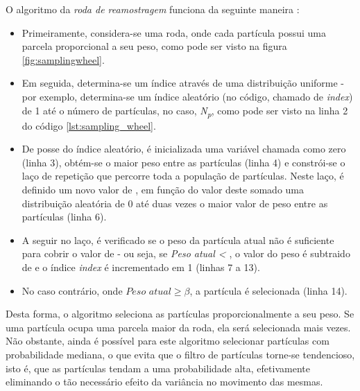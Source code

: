 \documentclass[
	12pt,				%
	openright,			%
	oneside,			%
	a4paper,			%
	english,			%
	french,				%
	spanish,			%
	brazil,				%
	]{abntex2}
\begin{document}


O algoritmo da \emph{roda de reamostragem} funciona da seguinte maneira \cite{resampling}:

\begin{itemize}
    \item Primeiramente, considera-se uma roda, onde cada partícula possui uma parcela proporcional a seu peso, como pode ser visto na figura \ref{fig:samplingwheel}.
    \item Em seguida, determina-se um índice através de uma distribuição uniforme - por exemplo, determina-se um índice aleatório (no código, chamado de \emph{index}) de 1 até o número de partículas, no caso, \emph{N\textsubscript{p}}, como pode ser visto na linha 2 do código \ref{lst:sampling_wheel}.
    \item De posse do índice aleatório, é inicializada uma variável chamada \textbeta{} como zero (linha 3), obtém-se o maior peso entre as partículas (linha 4) e constrói-se o laço de repetição que percorre toda a população de partículas. Neste laço, é definido um novo valor de \textbeta, em função do valor deste somado uma distribuição aleatória de 0 até duas vezes o maior valor de peso entre as partículas (linha 6).
    \item A seguir no laço, é verificado se o peso da partícula atual não é suficiente para cobrir o valor de \textbeta{} - ou seja, se \emph{Peso atual < \textbeta}, o valor do peso é subtraido de \textbeta{} e o índice \emph{index} é incrementado em 1 (linhas 7 a 13).
    \item No caso contrário, onde \emph{$Peso \,\, atual \ge \beta$}, a partícula é selecionada (linha 14).
\end{itemize}

Desta forma, o algoritmo seleciona as partículas proporcionalmente a seu peso. Se uma partícula ocupa uma parcela maior da roda, ela será selecionada mais vezes. Não obstante, ainda é possível para este algoritmo selecionar partículas com probabilidade mediana, o que evita que o filtro de partículas torne-se tendencioso, isto é, que as partículas tendam a uma probabilidade alta, efetivamente eliminando o tão necessário efeito da variância no movimento das mesmas.
\end{document}
